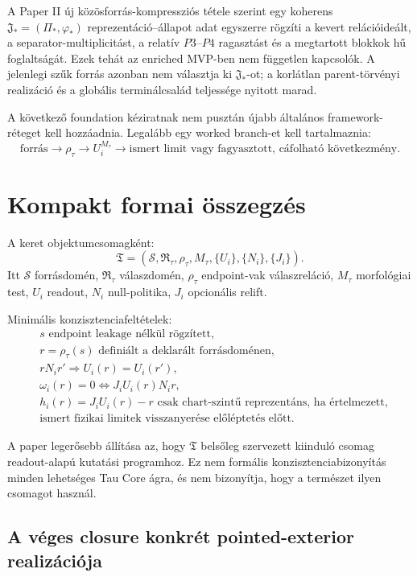 \documentclass[12pt]{article}
\newcommand{\Ssrc}{\mathcal S}
\newcommand{\RTspace}{\mathfrak R_{\tau}}
\newcommand{\Rmap}{\rho_{\tau}}
\newcommand{\Mta}{M_{\tau}}
\begin{document}
A Paper II új közösforrás-kompressziós tétele szerint egy koherens
\(\mathfrak J_*=(\Pi_*,\varphi_*)\) reprezentáció--állapot adat egyszerre
rögzíti a kevert relációideált, a separator-multiplicitást, a relatív
\(P3\)--\(P4\) ragasztást és a megtartott blokkok hű foglaltságát. Ezek tehát
az enriched MVP-ben nem független kapcsolók. A jelenlegi szűk forrás azonban
nem választja ki \(\mathfrak J_*\)-ot; a korlátlan parent-törvényi realizáció
és a globális terminálcsalád teljessége nyitott marad.

A következő foundation kéziratnak nem pusztán újabb általános framework-réteget
kell hozzáadnia.  Legalább egy worked branch-et kell tartalmaznia:
\[
  \text{forrás}\to \Rmap \to U_i^{\Mta}
  \to
  \text{ismert limit vagy fagyasztott, cáfolható következmény}.
\]

\section{Kompakt formai összegzés}

A keret objektumcsomagként:
\[
  \mathfrak T
  =
  (\Ssrc,\RTspace,\Rmap,\Mta,\{U_i\},\{N_i\},\{J_i\}).
\]
Itt \(\Ssrc\) forrásdomén, \(\RTspace\) válaszdomén, \(\Rmap\)
endpoint-vak válaszreláció, \(\Mta\) morfológiai test, \(U_i\) readout,
\(N_i\) null-politika, \(J_i\) opcionális relift.

Minimális konzisztenciafeltételek:
\begin{align}
  &s \text{ endpoint leakage nélkül rögzített},\\
  &r=\Rmap(s) \text{ definiált a deklarált forrásdoménen},\\
  &rN_i r'\Rightarrow U_i(r)=U_i(r'),\\
  &\omega_i(r)=0 \Longleftrightarrow J_iU_i(r)N_i r,\\
  &h_i(r)=J_iU_i(r)-r \text{ csak chart-szintű reprezentáns, ha értelmezett},\\
  &\text{ismert fizikai limitek visszanyerése előléptetés előtt}.
\end{align}

A paper legerősebb állítása az, hogy \(\mathfrak T\) belsőleg szervezett
kiinduló csomag readout-alapú kutatási programhoz.  Ez nem formális
konzisztenciabizonyítás minden lehetséges Tau Core ágra, és nem bizonyítja,
hogy a természet ilyen csomagot használ.

\subsection{A véges closure konkrét pointed-exterior realizációja}
\end{document}
